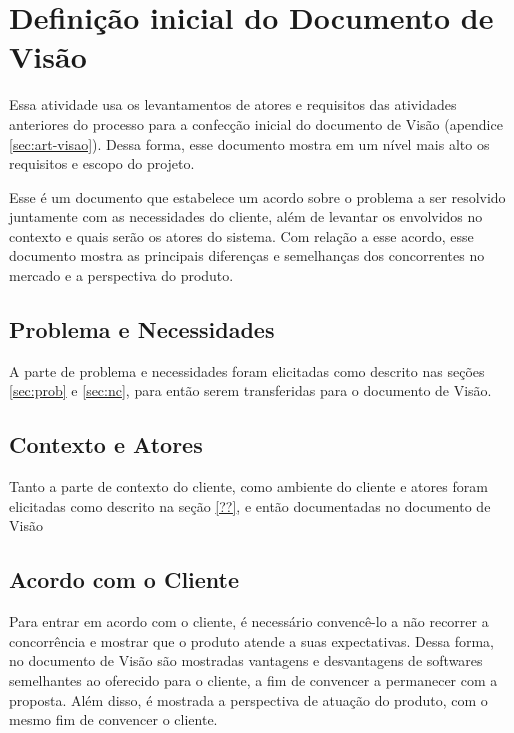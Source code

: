 \chapter{Definição inicial do Documento de Visão}
\label{sec:visao}

Essa atividade usa os levantamentos de atores e requisitos das atividades anteriores do processo para a confecção inicial do documento de Visão (apendice \ref{sec:art-visao}). Dessa forma, esse documento mostra em um nível mais alto os requisitos e escopo do projeto.

Esse é um documento que estabelece um acordo sobre o problema a ser resolvido juntamente com as necessidades do cliente, além de levantar os envolvidos no contexto e quais serão os atores do sistema. Com relação a esse acordo, esse documento mostra as principais diferenças e semelhanças dos concorrentes no mercado e a perspectiva do produto.

\section{Problema e Necessidades}
A parte de problema e necessidades foram elicitadas como descrito nas seções \ref{sec:prob} e \ref{sec:nc}, para então serem transferidas para o documento de Visão. 

\section{Contexto e Atores}
Tanto a parte de contexto do cliente, como ambiente do cliente e atores foram elicitadas como descrito na seção \ref{??}, e então documentadas no documento de Visão

\section{Acordo com o Cliente}
Para entrar em acordo com o cliente, é necessário convencê-lo a não recorrer a concorrência e mostrar que o produto atende a suas expectativas. Dessa forma, no documento de Visão são mostradas vantagens e desvantagens de softwares semelhantes ao oferecido para o cliente, a fim de convencer a permanecer com a proposta. Além disso, é mostrada a perspectiva de atuação do produto, com o mesmo fim de convencer o cliente.
